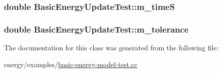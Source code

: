 \subsubsection[{\texorpdfstring{m\+\_\+timeS}{m_timeS}}]{\setlength{\rightskip}{0pt plus 5cm}double Basic\+Energy\+Update\+Test\+::m\+\_\+timeS\hspace{0.3cm}{\ttfamily [private]}}\hypertarget{classBasicEnergyUpdateTest_a4db29015c7b28c1b861621098e79cfe5}{}\label{classBasicEnergyUpdateTest_a4db29015c7b28c1b861621098e79cfe5}
\subsubsection[{\texorpdfstring{m\+\_\+tolerance}{m_tolerance}}]{\setlength{\rightskip}{0pt plus 5cm}double Basic\+Energy\+Update\+Test\+::m\+\_\+tolerance\hspace{0.3cm}{\ttfamily [private]}}\hypertarget{classBasicEnergyUpdateTest_af476a051fd73ccab6996bd516fd4746b}{}\label{classBasicEnergyUpdateTest_af476a051fd73ccab6996bd516fd4746b}


The documentation for this class was generated from the following file\+:\begin{DoxyCompactItemize}
\item 
energy/examples/\hyperlink{basic-energy-model-test_8cc}{basic-\/energy-\/model-\/test.\+cc}\end{DoxyCompactItemize}

